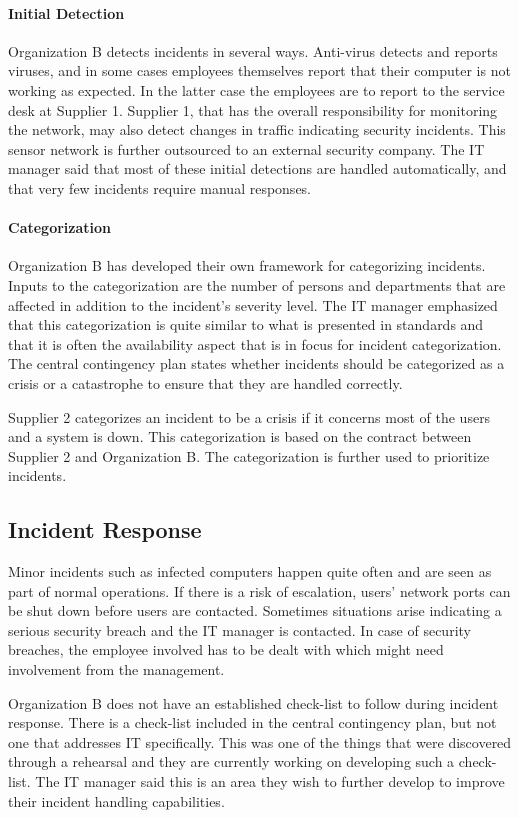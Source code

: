 \paragraph{Initial Detection}
Organization B detects incidents in several ways. Anti-virus detects and reports viruses, and in some cases employees themselves report that their computer is not working as expected. In the latter case the employees are to report to the service desk at Supplier 1. Supplier 1, that has the overall responsibility for monitoring the network, may also detect changes in traffic indicating security incidents. This sensor network is further outsourced to an external security company. The IT manager said that most of these initial detections are handled automatically, and that very few incidents require manual responses. 

\paragraph{Categorization}
Organization B has developed their own framework for categorizing incidents. Inputs to the categorization are the number of persons and departments that are affected in addition to the incident's severity level. The IT manager emphasized that this categorization is quite similar to what is presented in standards and that it is often the availability aspect that is in focus for incident categorization. The central contingency plan states whether incidents should be categorized as a crisis or a catastrophe to ensure that they are handled correctly.

Supplier 2 categorizes an incident to be a crisis if it concerns most of the users and a system is down. This categorization is based on the contract between Supplier 2 and Organization B. The categorization is further used to prioritize incidents.

\subsection{Incident Response}
Minor incidents such as infected computers happen quite often and are seen as part of normal operations. If there is a risk of escalation, users' network ports can be shut down before users are contacted. Sometimes situations arise indicating a serious security breach and the IT manager is contacted. In case of security breaches, the employee involved has to be dealt with which might need involvement from the management.

Organization B does not have an established check-list to follow during incident response. There is a check-list included in the central contingency plan, but not one that addresses IT specifically. This was one of the things that were discovered through a rehearsal and they are currently working on developing such a check-list. The IT manager said this is an area they wish to further develop to improve their incident handling capabilities. 

